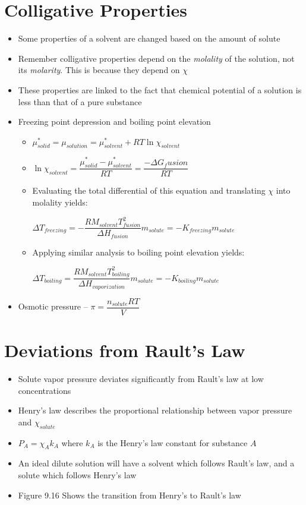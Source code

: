 \documentclass[12pt, openany, letterpaper]{memoir}
\begin{document}
\section*{Colligative Properties}
\begin{itemize}
	\item Some properties of a solvent are changed based on the amount of solute
	\item Remember colligative properties depend on the \emph{molality} of the solution, not its \emph{molarity}. This is because they depend on $\chi$
	\item These properties are linked to the fact that chemical potential of a solution is less than that of a pure substance
	\item Freezing point depression and boiling point elevation
	\begin{itemize}
		\item $\mu^*_{solid} = \mu_{solution} = \mu^*_{solvent}+RT\ln\chi_{solvent}$
		\item $\ln\chi_{solvent} = \dfrac{\mu^*_{solid}-\mu^*_{solvent}}{RT} = \dfrac{-\Delta G_fusion}{RT}$
		\item Evaluating the total differential of this equation and translating $\chi$ into molality yields:
		
		$\Delta T_{freezing}=-\dfrac{RM_{solvent}T_{fusion}^2}{\Delta H_{fusion}}m_{solute} = -K_{freezing}m_{solute}$
		\item Applying similar analysis to boiling point elevation yields:
		
		$\Delta T_{boiling}=\dfrac{RM_{solvent}T_{boiling}^2}{\Delta H_{vaporization}}m_{solute} = -K_{boiling}m_{solute}$
		
	\end{itemize}
	\item Osmotic pressure -- $\pi=\dfrac{n_{solute}RT}{V}$
\end{itemize}

\section*{Deviations from Rault's Law}
\begin{itemize}
	\item Solute vapor pressure deviates significantly from Rault's law at low concentrations
	\item Henry's law describes the proportional relationship between vapor pressure and $\chi_{solute}$
	\item $P_A = \chi_Ak_A$ where $k_A$ is the Henry's law constant for substance $A$
	\item An ideal dilute solution will have a solvent which follows Rault's law, and a solute which follows Henry's law	
	\item Figure 9.16 Shows the transition from Henry's to Rault's law	
\end{itemize}
\end{document}
